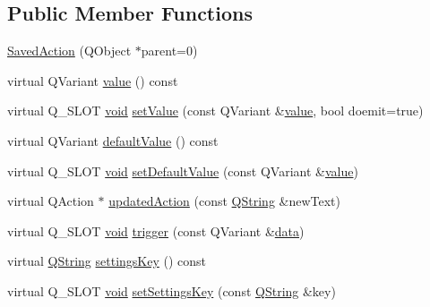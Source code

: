 \subsection*{Public Member Functions}
\begin{DoxyCompactItemize}
\item 
\hyperlink{class_utils_1_1_saved_action_ab15f15b12532741b7764d8fbee52562c}{Saved\-Action} (Q\-Object $\ast$parent=0)
\item 
virtual Q\-Variant \hyperlink{class_utils_1_1_saved_action_aed09984cf5a881b0988fb6702e968de3}{value} () const 
\item 
virtual Q\-\_\-\-S\-L\-O\-T \hyperlink{group___u_a_v_objects_plugin_ga444cf2ff3f0ecbe028adce838d373f5c}{void} \hyperlink{class_utils_1_1_saved_action_a0238473404fb4ac8ea3e934c0f188c5c}{set\-Value} (const Q\-Variant \&\hyperlink{glext_8h_aa0e2e9cea7f208d28acda0480144beb0}{value}, bool doemit=true)
\item 
virtual Q\-Variant \hyperlink{class_utils_1_1_saved_action_a46dfeb4d69f789f0bf09d18ed8d97497}{default\-Value} () const 
\item 
virtual Q\-\_\-\-S\-L\-O\-T \hyperlink{group___u_a_v_objects_plugin_ga444cf2ff3f0ecbe028adce838d373f5c}{void} \hyperlink{class_utils_1_1_saved_action_a1a746df3254216da19a2cd8a67f6966a}{set\-Default\-Value} (const Q\-Variant \&\hyperlink{glext_8h_aa0e2e9cea7f208d28acda0480144beb0}{value})
\item 
virtual Q\-Action $\ast$ \hyperlink{class_utils_1_1_saved_action_adb860d8816cd41a3236eaa1278e8a77b}{updated\-Action} (const \hyperlink{group___u_a_v_objects_plugin_gab9d252f49c333c94a72f97ce3105a32d}{Q\-String} \&new\-Text)
\item 
virtual Q\-\_\-\-S\-L\-O\-T \hyperlink{group___u_a_v_objects_plugin_ga444cf2ff3f0ecbe028adce838d373f5c}{void} \hyperlink{class_utils_1_1_saved_action_a2973d3383b69e819d53c2a814db60edf}{trigger} (const Q\-Variant \&\hyperlink{glext_8h_a8850df0785e6fbcc2351af3b686b8c7a}{data})
\item 
virtual \hyperlink{group___u_a_v_objects_plugin_gab9d252f49c333c94a72f97ce3105a32d}{Q\-String} \hyperlink{class_utils_1_1_saved_action_a0a22791e8b32f9fe1c624d5e8c87c2aa}{settings\-Key} () const 
\item 
virtual Q\-\_\-\-S\-L\-O\-T \hyperlink{group___u_a_v_objects_plugin_ga444cf2ff3f0ecbe028adce838d373f5c}{void} \hyperlink{class_utils_1_1_saved_action_ae953c28561478e670ba3a15b4bdb5d2c}{set\-Settings\-Key} (const \hyperlink{group___u_a_v_objects_plugin_gab9d252f49c333c94a72f97ce3105a32d}{Q\-String} \&key)

\end{DoxyCompactItemize}
